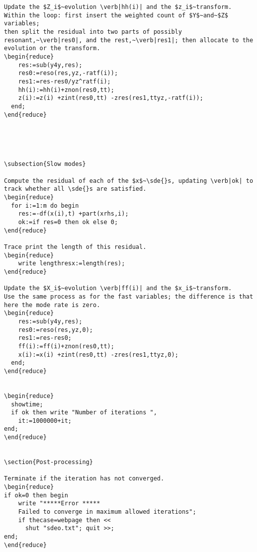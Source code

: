 \documentclass[11pt,a5paper]{article}
\begin{document}
\begin{reduce}
\begin{verbatim}
Update the $Z_i$~evolution \verb|hh(i)| and the $z_i$~transform.
Within the loop: first insert the weighted count of $Y$~and~$Z$ variables;
then split the residual into two parts of possibly resonant,~\verb|res0|, and the rest,~\verb|res1|; then allocate to the evolution or the transform.
\begin{reduce}
    res:=sub(y4y,res);
    res0:=reso(res,yz,-ratf(i));
    res1:=res-res0/yz^ratf(i);
    hh(i):=hh(i)+znon(res0,tt);
    z(i):=z(i) +zint(res0,tt) -zres(res1,ttyz,-ratf(i));
  end;
\end{reduce}





\subsection{Slow modes}

Compute the residual of each of the $x$~\sde{}s, updating \verb|ok| to track whether all \sde{}s are satisfied.
\begin{reduce}
  for i:=1:m do begin
    res:=-df(x(i),t) +part(xrhs,i);
    ok:=if res=0 then ok else 0;
\end{reduce}

Trace print the length of this residual.
\begin{reduce}
    write lengthresx:=length(res);
\end{reduce}

Update the $X_i$~evolution \verb|ff(i)| and the $x_i$~transform.
Use the same process as for the fast variables; the difference is that here the mode rate is zero.
\begin{reduce}
    res:=sub(y4y,res);
    res0:=reso(res,yz,0);
    res1:=res-res0;
    ff(i):=ff(i)+znon(res0,tt);
    x(i):=x(i) +zint(res0,tt) -zres(res1,ttyz,0);
  end;
\end{reduce}


\begin{reduce}
  showtime;
  if ok then write "Number of iterations ",
    it:=1000000+it;
end;
\end{reduce}


\section{Post-processing}

Terminate if the iteration has not converged.
\begin{reduce}
if ok=0 then begin
    write "*****Error *****
    Failed to converge in maximum allowed iterations";
    if thecase=webpage then <<
      shut "sdeo.txt"; quit >>;
end;
\end{reduce}


\end{verbatim}
\end{reduce}
\end{document}
